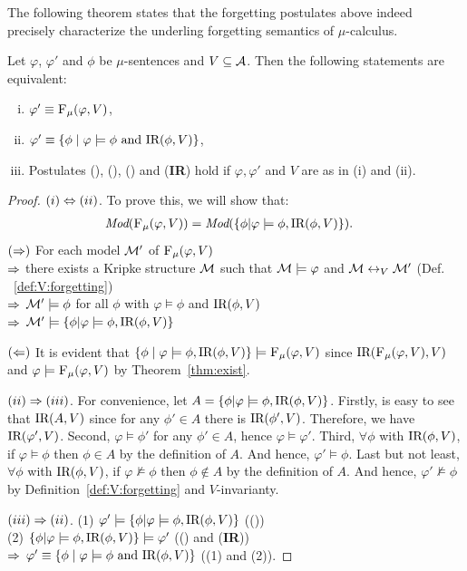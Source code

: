 \documentclass[runningheads]{llncs}
\begin{document}
The following theorem states that the forgetting postulates above indeed precisely characterize the underling forgetting semantics of $\mu$-calculus.
\begin{theorem}\label{thm:Rep}
Let $\varphi$, $\varphi'$ and $\phi$ be $\mu$-sentences and $V \subseteq {\cal A}$.
Then the following statements are equivalent:
\begin{enumerate}[(i)]
  \item $\varphi' \equiv {\textsc{F}_{\textsc{$\mu$}}}(\varphi, V)$,
  \item $\varphi'\equiv \{\phi \mid\varphi \models \phi \text{ and } \textrm{IR}(\phi, V)\}$,
  \item Postulates (\W), (\PP), (\NgP) and (\textbf{IR}) hold if $\varphi,   \varphi'$ and $V$ are as in (i) and (ii).
\end{enumerate}
\end{theorem}
\begin{proof}
$(i) \Leftrightarrow (ii)$. To prove this, we will show that:
\begin{align*}
 & \textit{Mod}({\textsc{F}_{\textsc{$\mu$}}}(\varphi, V)) = \textit{Mod}(\{\phi | \varphi \models \phi, \textrm{IR}(\phi, V)\}).
\end{align*}
$(\Rightarrow)$ For each model ${\cal M}'$ of ${\textsc{F}_{\textsc{$\mu$}}}(\varphi, V)$\\
$\Rightarrow$ there exists a Kripke structure ${\cal M}$ such that ${\cal M} \models \varphi$ and ${\cal M} \leftrightarrow_V {\cal M}'$ \hfill (Def. ~\ref{def:V:forgetting}) \\
$\Rightarrow$ ${\cal M}' \models \phi$ for all $\phi$ with $\varphi \models \phi$ and $\textrm{IR}(\phi, V)$ \\
$\Rightarrow$ ${\cal M}' \models \{\phi | \varphi \models \phi, \textrm{IR}(\phi, V)\}$

$(\Leftarrow)$ It is evident that $\{\phi \mid \varphi \models \phi, \textrm{IR}(\phi, V)\} \models {\textsc{F}_{\textsc{$\mu$}}}(\varphi, V)$ since $\textrm{IR}({\textsc{F}_{\textsc{$\mu$}}}(\varphi, V),V)$ and $\varphi \models {\textsc{F}_{\textsc{$\mu$}}}(\varphi, V)$ by Theorem~\ref{thm:exist}.

$(ii) \Rightarrow (iii)$. For convenience, let $A = \{\phi | \varphi \models \phi, \textrm{IR}(\phi, V)\}$. Firstly, is easy to see that $\textrm{IR}(A,V)$ since for any $\phi' \in A$ there is $\textrm{IR}(\phi',V)$.
Therefore, we have $\textrm{IR}(\varphi', V)$. Second, $\varphi \models \phi'$ for any $\phi'\in A$, hence $\varphi \models \varphi'$.
Third, $\forall \phi$ with $\textrm{IR}(\phi, V)$, if $\varphi \models \phi$ then $\phi \in A$ by the definition of $A$. And hence, $\varphi' \models \phi$.
Last but not least, $\forall \phi$ with $\textrm{IR}(\phi, V)$, if $\varphi \not \models \phi$ then $\phi \not \in A$ by the definition of $A$. And hence, $\varphi' \not \models \phi$ by Definition~\ref{def:V:forgetting} and $V$-invarianty.

$(iii) \Rightarrow (ii)$. (1) $\varphi' \models \{\phi | \varphi \models \phi, \textrm{IR}(\phi, V)\}$  \hfill ((\PP))\\
  (2) $\{\phi | \varphi \models \phi, \textrm{IR}(\phi, V)\} \models \varphi'$ \hfill ((\W) and (\textbf{IR}))\\
   $\Rightarrow$ $\varphi'\equiv \{\phi \mid\varphi \models \phi \text{ and } \textrm{IR}(\phi, V)\}$ \hfill ((1) and (2)).
\end{proof}
\end{document}
